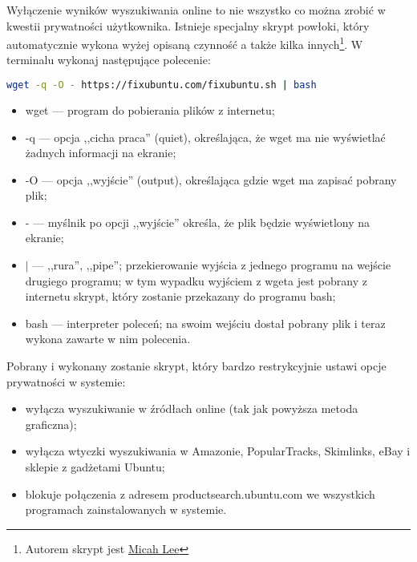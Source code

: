 Wyłączenie wyników wyszukiwania online to nie wszystko co można zrobić w kwestii prywatności użytkownika. Istnieje specjalny skrypt powłoki, który automatycznie wykona wyżej opisaną czynność a także kilka innych\footnote{Autorem skrypt jest \href{https://micahflee.com/}{Micah Lee}}. W terminalu wykonaj następujące polecenie:
\begin{lstlisting}[language=bash]
wget -q -O - https://fixubuntu.com/fixubuntu.sh | bash
\end{lstlisting}
\begin{itemize}
\item \textcolor{ubuntu_orange}{wget} --- program do pobierania plików z internetu;
\item \textcolor{ubuntu_orange}{-q} --- opcja ,,cicha praca'' (quiet), określająca, że wget ma nie wyświetlać żadnych informacji na ekranie;
\item \textcolor{ubuntu_orange}{-O} --- opcja ,,wyjście'' (output), określająca gdzie wget ma zapisać pobrany plik;
\item \textcolor{ubuntu_orange}{-} --- myślnik po opcji ,,wyjście'' określa, że plik będzie wyświetlony na ekranie;
\item \textcolor{ubuntu_orange}{$|$} --- ,,rura'', ,,pipe''; przekierowanie wyjścia z jednego programu na wejście drugiego programu; w tym wypadku wyjściem z wgeta jest pobrany z internetu skrypt, który zostanie przekazany do programu bash;
\item \textcolor{ubuntu_orange}{bash} --- interpreter poleceń; na swoim wejściu dostał pobrany plik i teraz wykona zawarte w nim polecenia.
\end{itemize}
Pobrany i wykonany zostanie skrypt, który bardzo restrykcyjnie ustawi opcje prywatności w systemie:
\begin{itemize}
\item wyłącza wyszukiwanie w źródłach online (tak jak powyższa metoda graficzna);
\item wyłącza wtyczki wyszukiwania w Amazonie, PopularTracks, Skimlinks, eBay i sklepie z gadżetami Ubuntu;
\item blokuje połączenia z adresem productsearch.ubuntu.com we wszystkich programach zainstalowanych w systemie.
\end{itemize}
